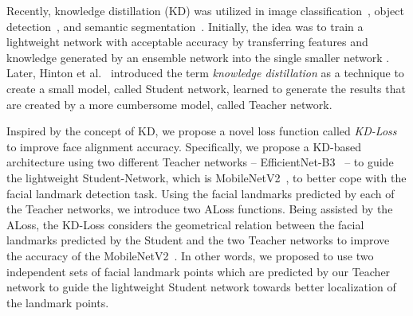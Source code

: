 \documentclass[times,twocolumn,final,authoryear]{elsarticle}
\begin{document}
Recently, knowledge distillation (KD) was utilized in image classification~\cite{hinton2015distilling,romero2014fitnets}, object detection~\cite{li2017mimicking}, and semantic segmentation~\cite{xie2018improving}. Initially, the idea was to train a lightweight network with acceptable accuracy by transferring features and knowledge generated by an ensemble network into the single smaller network \cite{modelcompression}. Later, Hinton et al.~\cite{hinton2015distilling} introduced the term \textit{knowledge distillation} as a technique to create a small model, called Student network, learned to generate the results that are created by a more cumbersome model, called Teacher network. 



Inspired by the concept of KD, we propose a novel loss function called \textit{KD-Loss} to improve face alignment accuracy. Specifically, we propose a KD-based architecture using two different Teacher networks -- EfficientNet-B3~\cite{tan2019efficientnet} -- to guide the lightweight Student-Network, which is MobileNetV2~\cite{sandler2018MobileNetV2}, to better cope with the facial landmark detection task. Using the facial landmarks predicted by each of the Teacher networks, we introduce two ALoss functions. Being assisted by the ALoss, the KD-Loss considers the geometrical relation between the facial landmarks predicted by the Student and the two Teacher networks to improve the accuracy of the MobileNetV2~\cite{sandler2018MobileNetV2}. In other words, we proposed to use two independent sets of facial landmark points which are predicted by our Teacher network to guide the lightweight Student network towards better localization of the landmark points.
\end{document}
